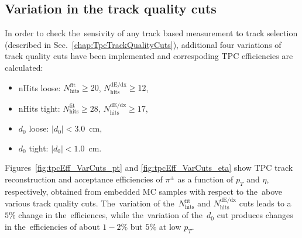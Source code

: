 \subsection{Variation in the track quality cuts}\label{Sec:TrackCutVariation}
In order to check the~sensivity of any track based measurement to track selection (described in Sec.~\ref{chap:TpcTrackQualityCuts}), additional four variations of track quality cuts have been implemented
and correspoding TPC efficiencies are calculated:
\begin{itemize}
	\item nHits loose: $N^\textrm{fit}_\textrm{hits}\geq 20$, $N^\textrm{dE/dx}_\textrm{hits}\geq 12$,
	\item nHits tight: $N^\textrm{fit}_\textrm{hits}\geq 28$, $N^\textrm{dE/dx}_\textrm{hits}\geq 17$,
	\item $d_0$ loose: $|d_0| < 3.0$~cm,
	\item $d_0$ tight: $|d_0| < 1.0$~cm.
\end{itemize}
Figures~\ref{fig:tpcEff_VarCuts_pt} and \ref{fig:tpcEff_VarCuts_eta} show TPC track reconstruction and acceptance  efficiencies of $\pi^{\pm}$ as a function of $p_T$ and $\eta$, respectively, obtained from embedded MC samples with respect to the~above various track quality cuts.  The~variation of the~$N^\textrm{fit}_\textrm{hits}$ and $N^\textrm{dE/dx}_\textrm{hits}$ cuts leads to a~$5\%$ change in the~efficiences, while the~variation of the~$d_0$ cut produces changes in the~efficiencies of about $1-2\%$ but $5\%$ at low $p_T$.
